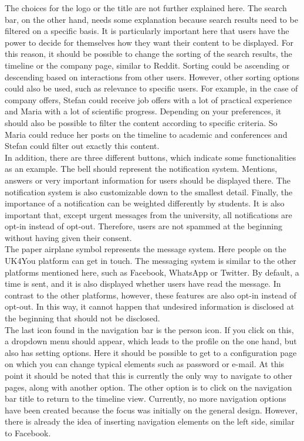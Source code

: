 The choices for the logo or the title are not further explained here.
The search bar, on the other hand, needs some explanation because search results need to be filtered on a specific basis.
It is particularly important here that users have the power to decide for themselves how they want their content to be displayed.
For this reason, it should be possible to change the sorting of the search results, the timeline or the company page, similar to Reddit.
Sorting could be ascending or descending based on interactions from other users.
However, other sorting options could also be used, such as relevance to specific users.
For example, in the case of company offers, Stefan could receive job offers with a lot of practical experience and Maria with a lot of scientific progress.
Depending on your preferences, it should also be possible to filter the content according to specific criteria.
So Maria could reduce her posts on the timeline to academic and conferences and Stefan could filter out exactly this content.\\

In addition, there are three different buttons, which indicate some functionalities as an example.
The bell should represent the notification system.
Mentions, answers or very important information for users should be displayed there.
The notification system is also customizable down to the smallest detail.
Finally, the importance of a notification can be weighted differently by students.
It is also important that, except urgent messages from the university, all notifications are opt-in instead of opt-out.
Therefore, users are not spammed at the beginning without having given their consent.\\

The paper airplane symbol represents the message system.
Here people on the UK4You platform can get in touch.
The messaging system is similar to the other platforms mentioned here, such as Facebook, WhatsApp or Twitter.
By default, a time is sent, and it is also displayed whether users have read the message.
In contrast to the other platforms, however, these features are also opt-in instead of opt-out.
In this way, it cannot happen that undesired information is disclosed at the beginning that should not be disclosed.\\

The last icon found in the navigation bar is the person icon.
If you click on this, a dropdown menu should appear, which leads to the profile on the one hand, but also has setting options.
Here it should be possible to get to a configuration page on which you can change typical elements such as password or e-mail.
At this point it should be noted that this is currently the only way to navigate to other pages, along with another option.
The other option is to click on the navigation bar title to return to the timeline view.
Currently, no more navigation options have been created because the focus was initially on the general design.
However, there is already the idea of inserting navigation elements on the left side, similar to Facebook.\\

